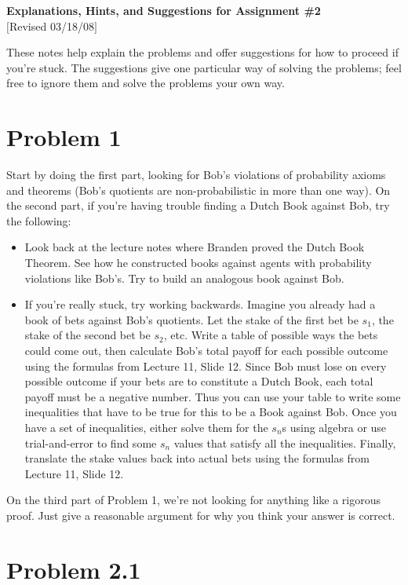 \documentclass[leqno,12pt]{article}
\begin{document}
\begin{center}
\textbf{{\large Explanations, Hints, and Suggestions for Assignment \#2}}\\
$[$Revised 03/18/08$]$

\end{center}

These notes help explain the problems and offer suggestions for how to proceed if you're stuck. The suggestions give one particular way of solving the problems; feel free to ignore them and solve the problems your own way.

\section{Problem 1}
Start by doing the first part, looking for Bob's violations of probability axioms and theorems (Bob's quotients are non-probabilistic in more than one way). On the second part, if you're having trouble finding a Dutch Book against Bob, try the following:
\begin{itemize}
\item{Look back at the lecture notes where Branden proved the Dutch Book Theorem. See how he constructed books against agents with probability violations like Bob's. Try to build an analogous book against Bob.}
\item{If you're really stuck, try working backwards. Imagine you already had a book of bets against Bob's quotients. Let the stake of the first bet be $s_1$, the stake of the second bet be $s_2$, etc. Write a table of possible ways the bets could come out, then calculate Bob's total payoff for each possible outcome using the formulas from Lecture 11, Slide 12. Since Bob must lose on every possible outcome if your bets are to constitute a Dutch Book, each total payoff must be a negative number. Thus you can use your table to write some inequalities that have to be true for this to be a Book against Bob. Once you have a set of inequalities, either solve them for the $s_n$s using algebra or use trial-and-error to find some $s_n$ values that satisfy all the inequalities. Finally, translate the stake values back into actual bets using the formulas from Lecture 11, Slide 12.}
\end{itemize} 

On the third part of Problem 1, we're not looking for anything like a rigorous proof. Just give a reasonable argument for why you think your answer is correct.

\section{Problem 2.1}
\end{document}
